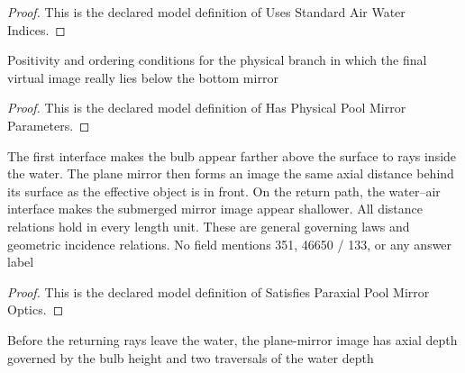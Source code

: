 \begin{proof}
  This is the declared model definition of Uses Standard Air Water Indices.
\end{proof}
\begin{definition}
  \label{def:physics:phyx-mini-0161:phyxminiproblems-problemphyxmini0161-hasphysicalpoolmirrorparameters}
  Positivity and ordering conditions for the physical branch in which the final virtual image really lies below the bottom mirror
\end{definition}
\begin{proof}
  This is the declared model definition of Has Physical Pool Mirror Parameters.
\end{proof}
\begin{definition}
  \label{def:physics:phyx-mini-0161:phyxminiproblems-problemphyxmini0161-satisfiesparaxialpoolmirroroptics}
  The first interface makes the bulb appear farther above the surface to rays inside the water. The plane mirror then forms an image the same axial distance behind its surface as the effective object is in front. On the return path, the water--air interface makes the submerged mirror image appear shallower. All distance relations hold in every length unit. These are general governing laws and geometric incidence relations. No field mentions 351, 46650 / 133, or any answer label
\end{definition}
\begin{proof}
  This is the declared model definition of Satisfies Paraxial Pool Mirror Optics.
\end{proof}
\begin{lemma}
  \label{lem:physics:phyx-mini-0161:phyxminiproblems-problemphyxmini0161-water-side-image-depth-index-relation}
  Before the returning rays leave the water, the plane-mirror image has axial depth governed by the bulb height and two traversals of the water depth
\end{lemma}
